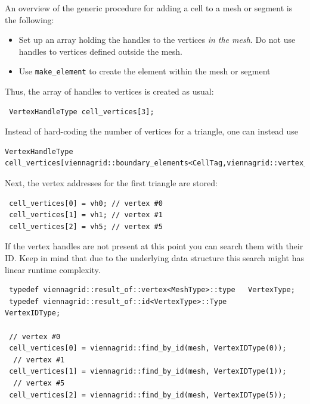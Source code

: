 

An overview of the generic procedure for adding a cell to a mesh or segment is the following:
  \begin{itemize}
   \item Set up an array holding the handles to the vertices \emph{in the mesh}. Do not use handles to vertices defined outside the mesh.
   \item Use \lstinline|make_element| to create the element within the mesh or segment
  \end{itemize}
Thus, the array of handles to vertices is created as usual:
\begin{lstlisting}
 VertexHandleType cell_vertices[3];
\end{lstlisting}
Instead of hard-coding the number of vertices for a triangle, one can instead use 
\begin{lstlisting}
VertexHandleType cell_vertices[viennagrid::boundary_elements<CellTag,viennagrid::vertex_tag>::num];
\end{lstlisting}


Next, the vertex addresses for the first triangle are stored:
\begin{lstlisting}
 cell_vertices[0] = vh0; // vertex #0
 cell_vertices[1] = vh1; // vertex #1
 cell_vertices[2] = vh5; // vertex #5
\end{lstlisting}


If the vertex handles are not present at this point you can search them with their ID. Keep in mind that due to the underlying data structure this search might has linear runtime complexity.
\begin{lstlisting}
 typedef viennagrid::result_of::vertex<MeshType>::type   VertexType;
 typedef viennagrid::result_of::id<VertexType>::Type       VertexIDType;
 
 // vertex #0
 cell_vertices[0] = viennagrid::find_by_id(mesh, VertexIDType(0));
  // vertex #1
 cell_vertices[1] = viennagrid::find_by_id(mesh, VertexIDType(1));
  // vertex #5
 cell_vertices[2] = viennagrid::find_by_id(mesh, VertexIDType(5));
\end{lstlisting}

